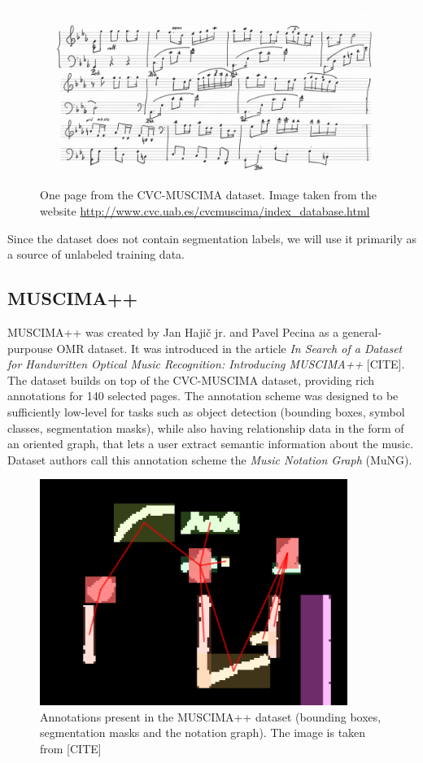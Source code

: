 \begin{figure}[ht]
    \centering
    \includegraphics[width=140mm]{../img/cvc-muscima.png}
    \caption{One page from the CVC-MUSCIMA dataset. Image taken from the website \url{http://www.cvc.uab.es/cvcmuscima/index_database.html}}
    \label{fig:CvcMuscima}
\end{figure}

Since the dataset does not contain segmentation labels, we will use it primarily as a source of unlabeled training data.


\subsection{MUSCIMA++}

MUSCIMA++ was created by Jan Hajič jr. and Pavel Pecina as a general-purpouse OMR dataset. It was introduced in the article \emph{In Search of a Dataset for Handwritten Optical Music Recognition: Introducing MUSCIMA++} [CITE]. The dataset builds on top of the CVC-MUSCIMA dataset, providing rich annotations for 140 selected pages. The annotation scheme was designed to be sufficiently low-level for tasks such as object detection (bounding boxes, symbol classes, segmentation masks), while also having relationship data in the form of an oriented graph, that lets a user extract semantic information about the music. Dataset authors call this annotation scheme the \emph{Music Notation Graph} (MuNG).

\begin{figure}[ht]
    \centering
    \includegraphics[width=100mm]{../img/muscima-pp.png}
    \caption{Annotations present in the MUSCIMA++ dataset (bounding boxes, segmentation masks and the notation graph). The image is taken from [CITE]}
    \label{fig:MuscimaPP}
\end{figure}

